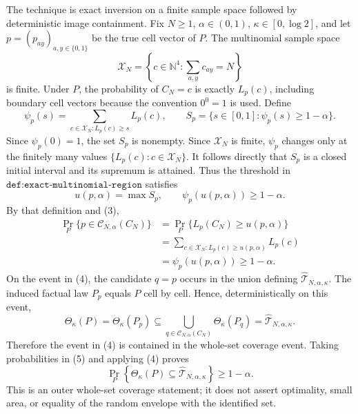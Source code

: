 The technique is exact inversion on a finite sample space followed by deterministic image containment.  Fix \(N\geq1\), \(\alpha\in(0,1)\), \(\kappa\in[0,\log2]\), and let \(p=(p_{ay})_{a,y\in\{0,1\}}\) be the true cell vector of \(P\).  The multinomial sample space
\[
\mathscr X_N=\left\{c\in\mathbb N^4:\sum_{a,y}c_{ay}=N\right\}
\tag{1}
\]
is finite.  Under \(P\), the probability of \(C_N=c\) is exactly \(L_p(c)\), including boundary cell vectors because the convention \(0^0=1\) is used.  Define
\[
\psi_p(s)=\sum_{c\in\mathscr X_N:L_p(c)\geq s}L_p(c),
\qquad
S_p=\{s\in[0,1]:\psi_p(s)\geq1-\alpha\}.
\tag{2}
\]
Since \(\psi_p(0)=1\), the set \(S_p\) is nonempty.  Since \(\mathscr X_N\) is finite, \(\psi_p\) changes only at the finitely many values \(\{L_p(c):c\in\mathscr X_N\}\).  It follows directly that \(S_p\) is a closed initial interval and its supremum is attained.  Thus the threshold in \(\texttt{def:exact-multinomial-region}\) satisfies
\[
u(p,\alpha)=\max S_p,\qquad
\psi_p(u(p,\alpha))\geq1-\alpha.
\tag{3}
\]
By that definition and (3),
\[
\begin{aligned}
\Pr_P\{p\in\mathcal C_{N,\alpha}(C_N)\}
&=\Pr_P\{L_p(C_N)\geq u(p,\alpha)\}\\
&=\sum_{c\in\mathscr X_N:L_p(c)\geq u(p,\alpha)}L_p(c)\\
&=\psi_p(u(p,\alpha))\geq1-\alpha.
\end{aligned}
\tag{4}
\]
On the event in (4), the candidate \(q=p\) occurs in the union defining \(\widehat{\mathcal T}_{N,\alpha,\kappa}\).  The induced factual law \(P_p\) equals \(P\) cell by cell.  Hence, deterministically on this event,
\[
\Theta_\kappa(P)=\Theta_\kappa(P_p)
\subseteq\bigcup_{q\in\mathcal C_{N,\alpha}(C_N)}\Theta_\kappa(P_q)
=\widehat{\mathcal T}_{N,\alpha,\kappa}.
\tag{5}
\]
Therefore the event in (4) is contained in the whole-set coverage event.  Taking probabilities in (5) and applying (4) proves
\[
\Pr_P\left\{\Theta_\kappa(P)\subseteq\widehat{\mathcal T}_{N,\alpha,\kappa}\right\}\geq1-\alpha.
\]
This is an outer whole-set coverage statement; it does not assert optimality, small area, or equality of the random envelope with the identified set.